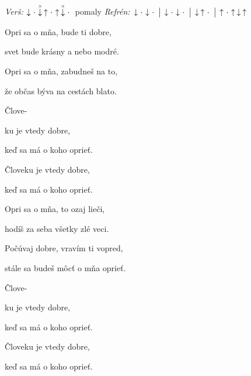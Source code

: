\begin{song}


\begin{headerbox}
\RaiseBoxWithAccents
\textit{Verš:} $\Down\Miss\ChuckDown\Up\Miss\Up\ChuckDown\Miss$ pomaly \quad
\textit{Refrén:} $\Down\Miss\Down\Miss \Separator \Down\Miss\Down\Miss \Separator \Down\Up\Miss \Separator \Up\Miss\Up\Down\Up$
\end{headerbox}

\begin{hchordbox}
\end{hchordbox}

\Large

\bigskip

 Opri sa o mňa,  bude ti dobre, \par
{} svet bude krásny  a nebo modré. \par
{} Opri sa o mňa,  zabudneš na to, \par
{} že občas býva na cestách blato. \par

\bigskip

 Člove- \par
{}ku je vtedy dobre,   \par
keď sa má o koho oprieť.  \par
Človeku je vtedy dobre,   \par
keď sa má o koho oprieť.  \par

\bigskip

 Opri sa o mňa,  to ozaj lieči, \par
{} hodíš za seba všetky zlé veci. \par
{} Počúvaj dobre,  vravím ti vopred, \par
{} stále sa budeš môcť o mňa oprieť. \par

\bigskip

 Člove- \par
{}ku je vtedy dobre,   \par
keď sa má o koho oprieť.  \par
Človeku je vtedy dobre,   \par
keď sa má o koho oprieť.  \par


\end{song}
